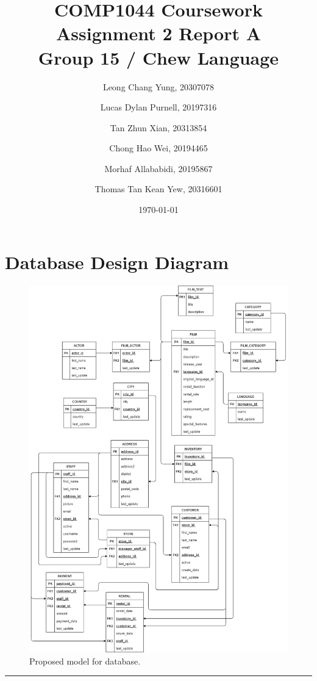\documentclass{article}
\title{\textbf{COMP1044 Coursework Assignment 2 Report A} \\ Group 15 / Chew Language}
\author{
	Leong Chang Yung, 20307078
	\and
	Lucas Dylan Purnell, 20197316
	\and
	Tan Zhun Xian, 20313854
	\and
	Chong Hao Wei, 20194465
	\and
	Morhaf Allababidi, 20195867
	\and
	Thomas Tan Kean Yew, 20316601
}
\date{\today}
\begin{document}
\maketitle
\newpage

\section{Database Design Diagram}
	\begin{figure}[H]
		\includegraphics[width=\textwidth]{DBI CourseworkA}
		\caption{Proposed model for database.}	
	\end{figure}
	\rule{\textwidth}{0.4pt}
		
\end{document}
